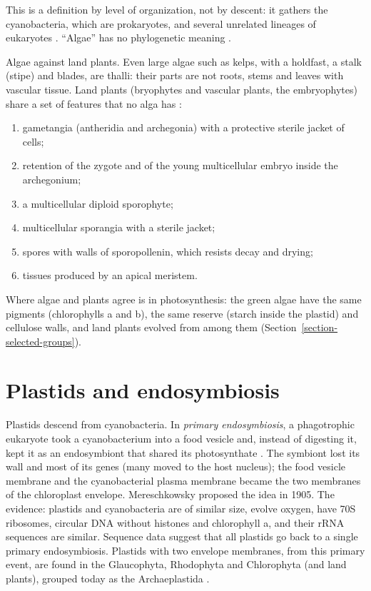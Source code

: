 This is a definition by level of
organization, not by descent: it gathers the
cyanobacteria, which are prokaryotes, and
several unrelated lineages of eukaryotes
\cite[Chapter 1]{lee2008phycology}. ``Algae''
has no phylogenetic meaning \cite[Chapter
25]{willey2008prescott}.

Algae against land plants. Even large algae
such as kelps, with a holdfast, a stalk
(stipe) and blades, are thalli: their parts
are not roots, stems and leaves with vascular
tissue. Land plants (bryophytes and vascular
plants, the embryophytes) share a set of
features that no alga has \cite[Chapter
16]{evert2013raven}:
\begin{enumerate}
\item gametangia (antheridia and archegonia)
with a protective sterile jacket of cells;
\item retention of the zygote and of the
young multicellular embryo inside the
archegonium;
\item a multicellular diploid sporophyte;
\item multicellular sporangia with a sterile
jacket;
\item spores with walls of sporopollenin,
which resists decay and drying;
\item tissues produced by an apical meristem.
\end{enumerate}
Where algae and plants agree is in
photosynthesis: the green algae have the same
pigments (chlorophylls a and b), the same
reserve (starch inside the plastid) and
cellulose walls, and land plants evolved from
among them
(Section~\ref{section-selected-groups}).

\section{Plastids and endosymbiosis}
\label{section-endosymbiosis}

Plastids descend from cyanobacteria. In
\emph{primary endosymbiosis}, a phagotrophic
eukaryote took a cyanobacterium into a food
vesicle and, instead of digesting it, kept it
as an endosymbiont that shared its
photosynthate \cite[Part III and Chapter
3]{lee2008phycology}. The symbiont lost its
wall and most of its genes (many moved to the
host nucleus); the food vesicle membrane and
the cyanobacterial plasma membrane became the
two membranes of the chloroplast envelope.
Mereschkowsky proposed the idea in 1905. The
evidence: plastids and cyanobacteria are of
similar size, evolve oxygen, have 70S
ribosomes, circular DNA without histones and
chlorophyll a, and their rRNA sequences are
similar. Sequence data suggest that all
plastids go back to a single primary
endosymbiosis. Plastids with two envelope
membranes, from this primary event, are found
in the Glaucophyta, Rhodophyta and
Chlorophyta (and land plants), grouped today
as the Archaeplastida \cite[Chapter
25]{willey2008prescott}.

